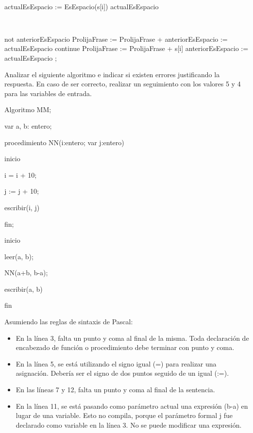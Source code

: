 \documentclass[answers]{exam}
\begin{document}
\begin{questions}
\begin{solution}
\begin{algorithm}[H]
\qquad	\Begin\

\qquad	\qquad	actualEsEspacio := EsEspacio(s[i])\;
\qquad	\qquad	\If actualEsEspacio \Then\

\qquad	\qquad	\Begin\

\qquad	\qquad	\qquad	\If not anteriorEsEspacio \Then ProlijaFrase := ProlijaFrase + \textsc{} \textsc{}\;
\qquad	\qquad	\qquad	anteriorEsEspacio := actualEsEspacio\;
\qquad	\qquad	\qquad	continue\;
\qquad	\qquad	\End\;
\qquad	\qquad	ProlijaFrase := ProlijaFrase + s[i]\;
\qquad	\qquad	anteriorEsEspacio := actualEsEspacio\;
\qquad	\End\;
\End;
\end{algorithm}

\end{solution}

\question Analizar el siguiente algoritmo e indicar si existen errores justificando la respuesta. En caso de ser correcto, realizar un seguimiento con los valores 5 y 4 para las variables de entrada.

\begin{algorithm}
Algoritmo MM;

var a, b: entero;

procedimiento NN(i:entero; var j:entero)

inicio

\qquad	i = i + 10;
	
\qquad	j := j + 10;
	
\qquad	escribir(i, j)
	
fin;

inicio

\qquad	leer(a, b);
	
\qquad	NN(a+b, b-a);
	
\qquad	escribir(a, b)

fin
\end{algorithm}

\begin{solution}
Asumiendo las reglas de sintaxis de Pascal:
\begin{itemize}
\item En la línea 3, falta un punto y coma al final de la misma. Toda declaración de encabezado de función o procedimiento debe terminar con punto y coma.
\item En la línea 5, se está utilizando el signo igual (=) para realizar una asignación. Debería ser el signo de dos puntos seguido de un igual (:=).
\item En las líneas 7 y 12, falta un punto y coma al final de la sentencia.
\item En la línea 11, se está pasando como parámetro actual una expresión (b-a) en lugar de una variable. Esto no compila, porque el parámetro formal j fue declarado como variable en la línea 3. No se puede modificar una expresión.
\end{itemize}
\end{solution}

\end{questions}
\end{document}
